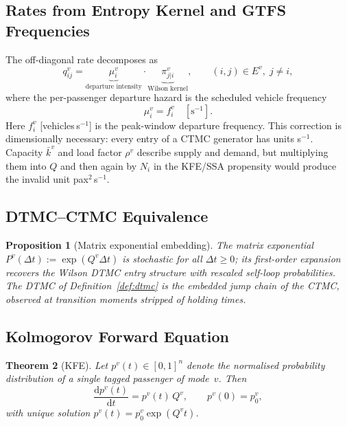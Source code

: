\documentclass[11pt,a4paper]{article}
\theoremstyle{plain}
\newtheorem{theorem}{Theorem}[section]
\newtheorem{proposition}[theorem]{Proposition}
\theoremstyle{definition}
\theoremstyle{remark}
\begin{document}
\subsection{Rates from Entropy Kernel and GTFS Frequencies}
\label{sec:rates}

The off-diagonal rate decomposes as
\begin{equation}
  q^v_{ij} =
  \underbrace{\mu^v_i}_{\text{departure intensity}}\cdot
  \underbrace{\pi^v_{j|i}}_{\text{Wilson kernel}},
  \qquad (i,j)\in E^v,\;j\ne i,
  \label{eq:rate}
\end{equation}
where the per-passenger departure hazard is the scheduled vehicle frequency
\begin{equation}
  \mu^v_i = f^v_i
  \quad[\text{s}^{-1}].
  \label{eq:intensity}
\end{equation}
Here $f^v_i$ [vehicles\,s$^{-1}$] is the peak-window departure frequency.
This correction is dimensionally necessary: every entry of a CTMC generator
has units s$^{-1}$.  Capacity $\bar{k}^v$ and load factor $\rho^v$ describe
supply and demand, but multiplying them into $Q$ and then again by $N_i$ in
the KFE/SSA propensity would produce the invalid unit pax$^2$\,s$^{-1}$.

\subsection{DTMC--CTMC Equivalence}

\begin{proposition}[Matrix exponential embedding]
The matrix exponential $P^v(\Delta t):=\exp(Q^v\Delta t)$ is stochastic for
all $\Delta t\ge0$; its first-order expansion recovers the Wilson DTMC entry
structure with rescaled self-loop probabilities.  The DTMC of
Definition~\ref{def:dtmc} is the \emph{embedded jump chain} of the CTMC,
observed at transition moments stripped of holding times.
\end{proposition}

\subsection{Kolmogorov Forward Equation}

\begin{theorem}[KFE]
Let $p^v(t)\in[0,1]^n$ denote the normalised probability distribution of a
single tagged passenger of mode~$v$.  Then
\begin{equation}
  \frac{\mathrm{d}p^v(t)}{\mathrm{d}t} = p^v(t)\,Q^v,\qquad
  p^v(0)=p^v_0,\label{eq:kfe}
\end{equation}
with unique solution $p^v(t)=p^v_0\exp(Q^v t)$.
\end{theorem}
\end{document}
